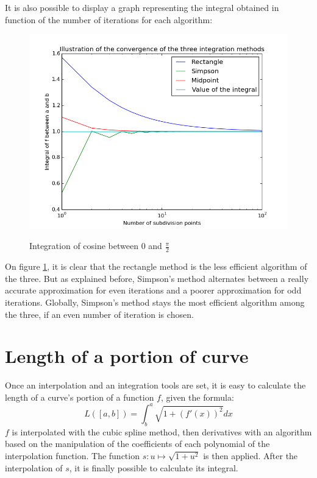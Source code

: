 \documentclass{article}
\begin{document}
It is also possible to display a graph representing the integral obtained in function of the number of iterations for each algorithm:

\begin{figure}[h]
  \centering
  \caption{Integration of cosine between $0$ and $\frac{\pi}{2}$}
  \includegraphics[width=12cm]{cosinus_integration}
  \label{cosinus_integration}
\end{figure}

On figure \ref{cosinus_integration}, it is clear that the rectangle method is the less efficient algorithm of the three. But as explained before, Simpson's method alternates between a really accurate approximation for even iterations and a poorer approximation for odd iterations. Globally, Simpson's method stays the most efficient algorithm among the three, if an even number of iteration is chosen.

\section{Length of a portion of curve}

Once an interpolation and an integration tools are set, it is easy to calculate the length of a curve's portion of a function $f$, given the formula:
\begin{equation}
  L([a, b]) = \int^a_b{\sqrt{1 + (f'(x))^2} dx}
\end{equation} 
$f$ is interpolated with the cubic spline method, then derivatives with an algorithm based on the manipulation of the coefficients of each polynomial of the interpolation function. The function $s: u \mapsto \sqrt{1 + u^2}$ is then applied. After the interpolation of $s$, it is finally possible to calculate its integral.
\end{document}
